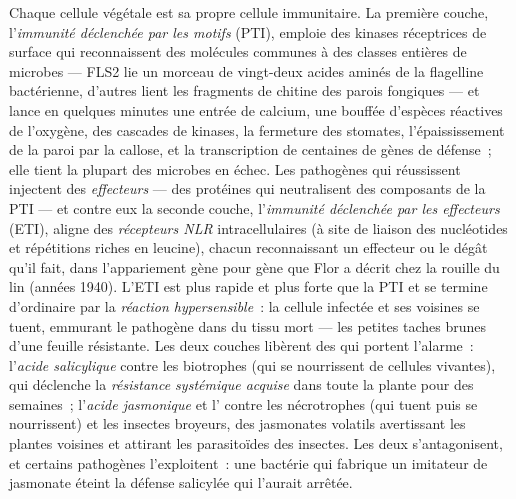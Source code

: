 \begin{definition}\label{def:b3:plant-molecular-physiology:immunity}
Chaque cellule végétale est sa propre cellule immunitaire. La première
couche, l'\emph{immunité déclenchée par les motifs} (PTI), emploie des
kinases réceptrices de surface qui reconnaissent des molécules communes
à des classes entières de microbes --- FLS2 lie un morceau de vingt-deux
acides aminés de la flagelline bactérienne, d'autres lient les fragments
de chitine des parois fongiques --- et lance en quelques minutes une
entrée de calcium, une bouffée d'espèces réactives de l'oxygène, des
cascades de kinases, la fermeture des stomates, l'épaississement de la
paroi par la callose, et la transcription de centaines de gènes de
défense~; elle tient la plupart des microbes en échec. Les pathogènes
qui réussissent injectent des \emph{effecteurs} --- des protéines qui
neutralisent des composants de la PTI --- et contre eux la seconde
couche, l'\emph{immunité déclenchée par les effecteurs} (ETI), aligne
des \emph{récepteurs NLR} intracellulaires (à site de liaison des
nucléotides et répétitions riches en leucine), chacun reconnaissant un
effecteur ou le dégât qu'il fait, dans l'appariement gène pour gène que
Flor a décrit chez la rouille du lin (années 1940). L'ETI est plus
rapide et plus forte que la PTI et se termine d'ordinaire par la
\emph{réaction hypersensible}~: la cellule infectée et ses voisines se
tuent, emmurant le pathogène dans du tissu mort --- les petites taches
brunes d'une feuille résistante. Les deux couches libèrent des 
qui portent l'alarme~: l'\emph{acide salicylique} contre les biotrophes
(qui se nourrissent de cellules vivantes), qui déclenche la
\emph{résistance systémique acquise} dans toute la plante pour des
semaines~; l'\emph{acide jasmonique} et l' contre les
nécrotrophes (qui tuent puis se nourrissent) et les insectes broyeurs,
des jasmonates volatils avertissant les plantes voisines et attirant les
parasitoïdes des insectes. Les deux  s'antagonisent, et certains
pathogènes l'exploitent~: une bactérie qui fabrique un imitateur de
jasmonate éteint la défense salicylée qui l'aurait arrêtée.
\end{definition}

